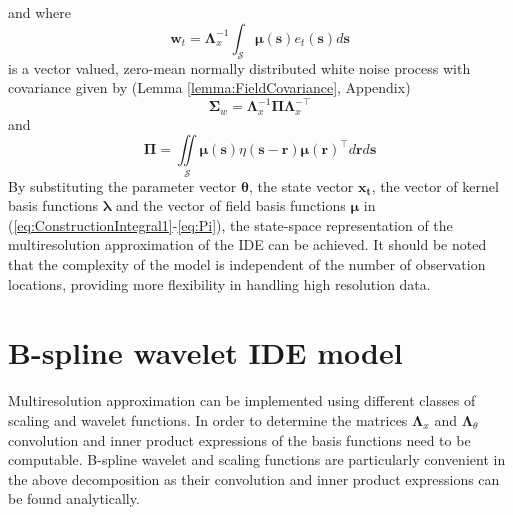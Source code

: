\documentclass[11pt,draftcls,onecolumn,peerreview]{IEEEtran}
\begin{document}
\\ \\ and where 
\begin{equation}
 \mathbf{w}_t=\mathbf{\Lambda}_{x}^{-1}\int_{\mathcal{S}}\boldsymbol\mu \left(\mathbf{s}\right)e_t\left(\mathbf{s}\right)d\mathbf{s}
\label{CovofField}
\end{equation}
 is a vector valued, zero-mean normally distributed white noise process with covariance given by (Lemma \ref{lemma:FieldCovariance}, Appendix)
\begin{equation}
\boldsymbol\Sigma_w =\mathbf{\Lambda}_{x}^{-1}\boldsymbol\Pi\mathbf{\Lambda}_{x}^{-\top}
\end{equation}
and
\begin{equation}
 \boldsymbol\Pi=\iint\limits_{\mathcal{S}}\boldsymbol\mu\left(\mathbf{s}\right)\eta\left(\mathbf{s}-\mathbf{r}\right)\boldsymbol\mu\left(\mathbf{r}\right)^{\top}d\mathbf{r}d\mathbf{s}
\label{eq:Pi}
\end{equation}
By substituting the  parameter vector $\boldsymbol\theta$, the  state vector $\mathbf{x_t}$, the vector of kernel basis functions $\boldsymbol\lambda$ and the vector of field basis functions $\boldsymbol\mu$ in (\ref{eq:ConstructionIntegral1}-\ref{eq:Pi}), the state-space representation of the multiresolution approximation of the IDE can be achieved. It should be noted that the complexity of the model is independent of the number of observation locations, providing more flexibility in handling high resolution data. %


\section{B-spline wavelet IDE model}
Multiresolution approximation can be implemented using different classes of scaling and wavelet functions. In order to determine the matrices $ \boldsymbol\Lambda_x$ and $\boldsymbol \Lambda_{\theta}$ convolution and inner product expressions of the basis functions need to be computable. B-spline wavelet and scaling functions are particularly convenient in the above decomposition as their convolution and inner product expressions can be found analytically.
\end{document}
